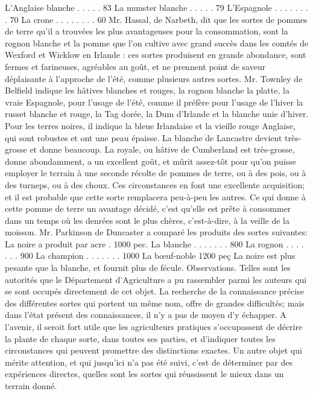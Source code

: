 L'Anglaise blanche . . . . . 83
La munster blanche . . . . . 79
L'Espagnole . . . . . . . . 70
La crone . . . . . . . . 60
Mr. Hassal, de Narbeth, dit que les sortes de pommes de terre qu'il a trouvées les plus avantageuses pour la consommation, sont la rognon blanche et la pomme que l'on cultive avec grand succès dans les comtés de Wexford et Wicklow en Irlande : ces sortes produisent en grande abondance, sont fermes et farineuses, agréables au goût, et ne prennent point de saveur déplaisante à l'approche de l'été, comme plusieurs autres sortes.
Mr. Townley de Belfield indique les hâtives blanches et rouges, la rognon blanche\setcounter{page}{265} la platte, la vraie Espagnole, pour l'usage de l'été, comme il préfère pour l'usage de l'hiver la russet blanche et rouge, la Tag dorée, la Dum d'Irlande et la blanche unie d'hiver. Pour les terres noires, il indique la bleue Irlandaise et la vieille rouge Anglaise, qui sont robustes et ont une peau épaisse. La blanche de Lancastre devient très-grosse et donne beaucoup.
La royale, ou hâtive de Cumberland est très-grosse, donne abondamment, a un excellent goût, et mûrit assez-tôt pour qu'on puisse employer le terrain à une seconde récolte de pommes de terre, ou à des pois, ou à des turneps, ou à des choux. Ces circonstances en font une excellente acquisition; et il est probable que cette sorte remplacera peu-à-peu les autres. Ce qui donne à cette pomme de terre un avantage décidé, c'est qu'elle est prête à consommer dans un temps où les denrées sont le plus chères, c'est-à-dire, à la veille de la moisson.
Mr. Parkinson de Duncaster a comparé les produits des sortes suivantes:
La noire a produit par acre . 1000 pec.
La blanche . . . . . . . 800
La rognon . . . . . . . 900
La champion . . . . . . . 1000\setcounter{page}{266} La bœuf-noble 1200 peç
La noire est plus pesante que la blanche, et fournit plus de fécule.
Observations.
Telles sont les autorités que le Département d'Agriculture a pu rassembler parmi les auteurs qui se sont occupés directement de cet objet. La recherche de la connaissance précise des différentes sortes qui portent un même nom, offre de grandes difficultés; mais dans l'état présent des connaissances, il n'y a pas de moyen d'y échapper. A l'avenir, il seroit fort utile que les agriculteurs pratiques s'occupassent de décrire la plante de chaque sorte, dans toutes ses parties, et d'indiquer toutes les circonstances qui peuvent promettre des distinctions exactes. Un autre objet qui mérite attention, et qui jusqu'ici n'a pas été suivi, c'est de déterminer par des expériences directes, quelles sont les sortes qui réussissent le mieux dans un terrain donné.
